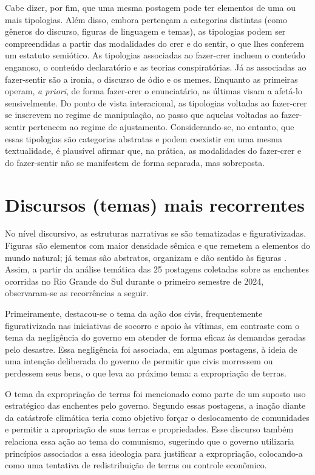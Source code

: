 \documentclass[portuguese]{textolivre}
\begin{document}
Cabe dizer, por fim, que uma mesma postagem pode ter elementos de uma ou mais tipologias. Além disso, embora pertençam a categorias distintas (como gêneros do discurso, figuras de linguagem e temas), as tipologias podem ser compreendidas a partir das modalidades do crer e do sentir, o que lhes conferem um estatuto semiótico. As tipologias associadas ao fazer-crer incluem o conteúdo enganoso, o conteúdo declaratório e as teorias conspiratórias. Já as associadas ao fazer-sentir são a ironia, o discurso de ódio e os memes. Enquanto as primeiras operam, \textit{a priori}, de forma fazer-crer o enunciatário, as últimas visam a afetá-lo sensivelmente. Do ponto de vista interacional, as tipologias voltadas ao fazer-crer se inscrevem no regime de manipulação, ao passo que aquelas voltadas ao fazer-sentir pertencem ao regime de ajustamento. Considerando-se, no entanto, que essas tipologias são categorias abstratas e podem coexistir em uma mesma textualidade, é plausível afirmar que, na prática, as modalidades do fazer-crer e do fazer-sentir não se manifestem de forma separada, mas sobreposta.

\section{Discursos (temas) mais recorrentes}\label{sec-discursos_rec}
No nível discursivo, as estruturas narrativas se são tematizadas e figurativizadas. Figuras são elementos com maior densidade sêmica e que remetem a elementos do mundo natural; já temas são abstratos, organizam e dão sentido às figuras \cite{greimas2008}. Assim, a partir da análise temática das 25 postagens coletadas sobre as enchentes ocorridas no Rio Grande do Sul durante o primeiro semestre de 2024, observaram-se as recorrências a seguir. 

Primeiramente, destacou-se o tema da ação dos civis, frequentemente figurativizada nas iniciativas de socorro e apoio às vítimas, em contraste com o tema da negligência do governo em atender de forma eficaz às demandas geradas pelo desastre. Essa negligência foi associada, em algumas postagens, à ideia de uma intenção deliberada do governo de permitir que civis morressem ou perdessem seus bens, o que leva ao próximo tema: a expropriação de terras.

O tema da expropriação de terras foi mencionado como parte de um suposto uso estratégico das enchentes pelo governo. Segundo essas postagens, a inação diante da catástrofe climática teria como objetivo forçar o deslocamento de comunidades e permitir a apropriação de suas terras e propriedades. Esse discurso também relaciona essa ação ao tema do comunismo, sugerindo que o governo utilizaria princípios associados a essa ideologia para justificar a expropriação, colocando-a como uma tentativa de redistribuição de terras ou controle econômico.
\end{document}
